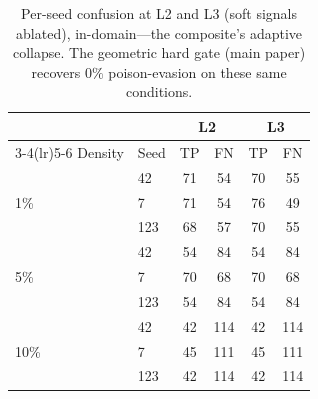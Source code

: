 \documentclass[10pt,journal,compsoc]{IEEEtran}
\begin{document}
\begin{table}[t]
\centering
\caption{Per-seed confusion at L2 and L3 (soft signals ablated), in-domain---the
composite's adaptive collapse. The geometric hard gate (main paper)
recovers $0\%$ poison-evasion on these same conditions.}
\label{tab:confL23}
\begin{tabular}{llcccc}
\toprule
 & & \multicolumn{2}{c}{L2} & \multicolumn{2}{c}{L3} \\
\cmidrule(lr){3-4}\cmidrule(lr){5-6}
Density & Seed & TP & FN & TP & FN \\
\midrule
\multirow{3}{*}{1\%}  & 42  & 71 & 54  & 70 & 55  \\
                      & 7   & 71 & 54  & 76 & 49  \\
                      & 123 & 68 & 57  & 70 & 55  \\
\midrule
\multirow{3}{*}{5\%}  & 42  & 54 & 84  & 54 & 84  \\
                      & 7   & 70 & 68  & 70 & 68  \\
                      & 123 & 54 & 84  & 54 & 84  \\
\midrule
\multirow{3}{*}{10\%} & 42  & 42 & 114 & 42 & 114 \\
                      & 7   & 45 & 111 & 45 & 111 \\
                      & 123 & 42 & 114 & 42 & 114 \\
\bottomrule
\end{tabular}
\end{table}
\end{document}
